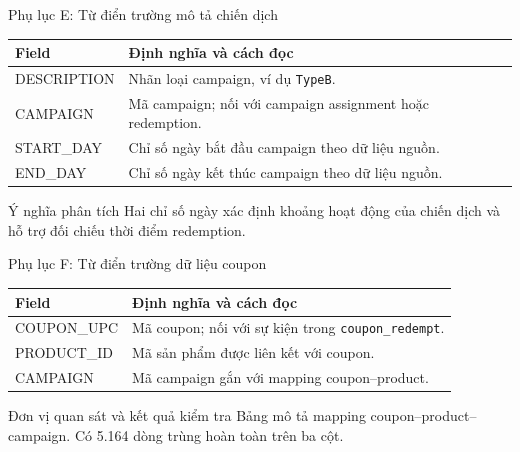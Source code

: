 \documentclass[smaller,aspectratio=169,t]{beamer}
\newcommand{\toprule}{\hline}
\newcommand{\midrule}{\hline}
\newcommand{\bottomrule}{\hline}}
\begin{document}
\begin{frame}{Phụ lục E: Từ điển trường mô tả chiến dịch}
\small\renewcommand{\arraystretch}{1.25}
\begin{tabularx}{\textwidth}{>{\ttfamily}p{3.5cm}X}
\toprule Field & Định nghĩa và cách đọc \\
\midrule
DESCRIPTION & Nhãn loại campaign, ví dụ \texttt{TypeB}. \\
CAMPAIGN & Mã campaign; nối với campaign assignment hoặc redemption. \\
START\_DAY & Chỉ số ngày bắt đầu campaign theo dữ liệu nguồn. \\
END\_DAY & Chỉ số ngày kết thúc campaign theo dữ liệu nguồn. \\
\bottomrule
\end{tabularx}
\vspace{5mm}\begin{block}{Ý nghĩa phân tích}
Hai chỉ số ngày xác định khoảng hoạt động của chiến dịch và hỗ trợ đối chiếu thời điểm redemption.
\end{block}
\end{frame}

\begin{frame}{Phụ lục F: Từ điển trường dữ liệu coupon}
\small\renewcommand{\arraystretch}{1.3}
\begin{tabularx}{\textwidth}{>{\ttfamily}p{3.5cm}X}
\toprule Field & Định nghĩa và cách đọc \\
\midrule
COUPON\_UPC & Mã coupon; nối với sự kiện trong \texttt{coupon\_redempt}. \\
PRODUCT\_ID & Mã sản phẩm được liên kết với coupon. \\
CAMPAIGN & Mã campaign gắn với mapping coupon--product. \\
\bottomrule
\end{tabularx}
\vspace{5mm}\begin{block}{Đơn vị quan sát và kết quả kiểm tra}
Bảng mô tả mapping coupon--product--campaign. Có 5.164 dòng trùng hoàn toàn trên ba cột.
\end{block}
\end{frame}
\end{document}

